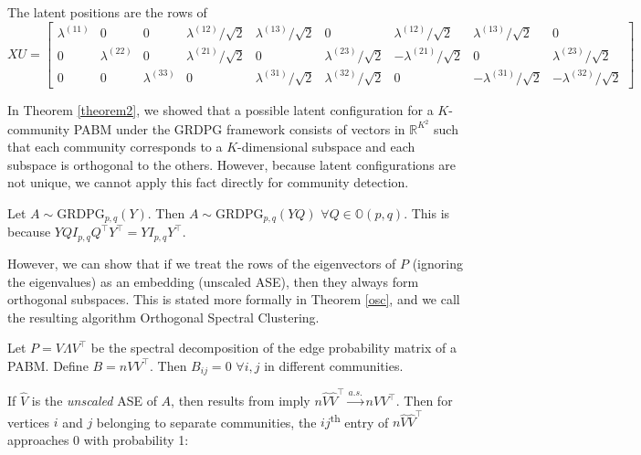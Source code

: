 \documentclass[
  11pt,
]{article}
\begin{document}
\begin{example}[$K = 3$]
The latent positions are the rows of  
$$XU = \begin{bmatrix}
  \lambda^{(11)} & 0 & 0 & 
  \lambda^{(12)} / \sqrt{2} & \lambda^{(13)} / \sqrt{2} & 0 & 
  \lambda^{(12)} / \sqrt{2} & \lambda^{(13)} / \sqrt{2} & 0 \\
  0 & \lambda^{(22)} & 0 & 
  \lambda^{(21)} / \sqrt{2} & 0 & \lambda^{(23)} / \sqrt{2} & 
  -\lambda^{(21)} / \sqrt{2} & 0 & \lambda^{(23)} / \sqrt{2} \\
  0 & 0 & \lambda^{(33)} & 
  0 & \lambda^{(31)} / \sqrt{2} & \lambda^{(32)} / \sqrt{2} & 
  0 & -\lambda^{(31)} / \sqrt{2} & -\lambda^{(32)} / \sqrt{2}
\end{bmatrix}$$
\end{example}

In Theorem \ref{theorem2}, we showed that a possible latent
configuration for a \(K\)-community PABM under the GRDPG framework
consists of vectors in \(\mathbb{R}^{K^2}\) such that each community
corresponds to a \(K\)-dimensional subspace and each subspace is
orthogonal to the others. However, because latent configurations are not
unique, we cannot apply this fact directly for community detection.

\begin{remark}
Let $A \sim \text{GRDPG}_{p, q}(Y)$. Then $A\sim \text{GRDPG}_{p, q}(Y Q)$ $\forall Q \in \mathbb{O}(p, q)$. This is because $Y Q I_{p, q} Q^\top Y^\top = Y I_{p, q} Y^\top$. 
\end{remark}

However, we can show that if we treat the rows of the eigenvectors of
\(P\) (ignoring the eigenvalues) as an embedding (unscaled ASE), then
they always form orthogonal subspaces. This is stated more formally in
Theorem \ref{osc}, and we call the resulting algorithm Orthogonal
Spectral Clustering.

\begin{theorem}
\label{osc}
Let $P = V \Lambda V^\top$ be the spectral decomposition of the edge probability matrix of a PABM. Define $B = n V V^\top$. Then $B_{ij} = 0$ $\forall i, j$ in different communities. 
\end{theorem}

If \(\hat{V}\) is the \emph{unscaled} ASE of \(A\), then results from
\citet{rubindelanchy2017statistical} imply
\(n \hat{V} \hat{V}^\top \stackrel{a.s.}{\to} n V V^\top\). Then for
vertices \(i\) and \(j\) belonging to separate communities, the
\(ij\)\textsuperscript{th} entry of \(n \hat{V} \hat{V}^\top\)
approaches 0 with probability 1:
\end{document}
